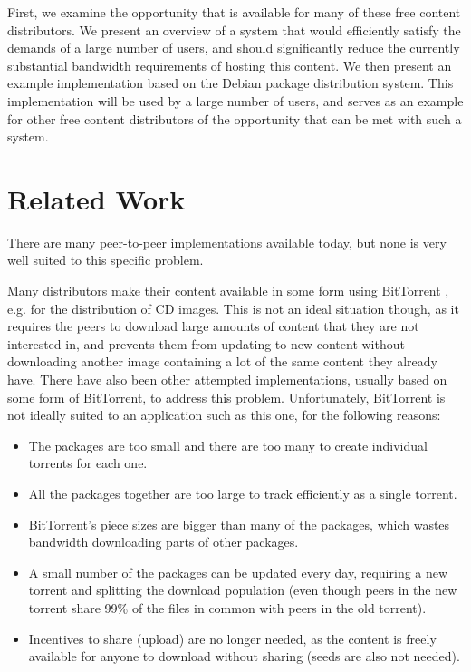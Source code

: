 \documentclass[conference]{IEEEtran}
\begin{document}
First, we examine the opportunity that is available for many of
these free content distributors. We present an overview of a system
that would efficiently satisfy the demands of a large number of
users, and should significantly reduce the currently substantial
bandwidth requirements of hosting this content. We then present an
example implementation based on the Debian package distribution
system. This implementation will be used by a large number of users,
and serves as an example for other free content distributors of the
opportunity that can be met with such a system.


\section{Related Work}
\label{related}

There are many peer-to-peer implementations available today, but
none is very well suited to this specific problem.

Many distributors make their content available in some form using
BitTorrent \cite{COHEN03}, e.g. for the distribution of CD
images. This is not an ideal situation though, as it requires the
peers to download large amounts of content that they are not
interested in, and prevents them from updating to new content
without downloading another image containing a lot of the same
content they already have. There have also been other attempted
implementations, usually based on some form of BitTorrent, to
address this problem. Unfortunately, BitTorrent is not ideally
suited to an application such as this one, for the following
reasons:
\begin{itemize}
 \item The packages are too small and there are too many to create
       individual torrents for each one.
 \item All the packages together are too large to track efficiently
       as a single torrent.
 \item BitTorrent's piece sizes are bigger than many of the
       packages, which wastes bandwidth downloading parts of other
       packages.
 \item A small number of the packages can be updated every day,
       requiring a new torrent and splitting the
       download population (even though peers in the new torrent
       share 99\% of the files in common with peers in the old
       torrent).
 \item Incentives to share (upload) are no longer needed, as the
       content is freely available for anyone to download without
       sharing (seeds are also not needed).
\end{itemize}
\end{document}
